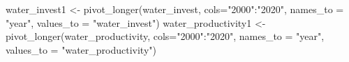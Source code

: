 \documentclass[
]{article}
\newenvironment{Shaded}{\begin{snugshade}}{\end{snugshade}}
\newcommand{\AttributeTok}[1]{\textcolor[rgb]{0.77,0.63,0.00}{#1}}
\newcommand{\FunctionTok}[1]{\textcolor[rgb]{0.00,0.00,0.00}{#1}}
\newcommand{\NormalTok}[1]{#1}
\newcommand{\OtherTok}[1]{\textcolor[rgb]{0.56,0.35,0.01}{#1}}
\newcommand{\SpecialCharTok}[1]{\textcolor[rgb]{0.00,0.00,0.00}{#1}}
\newcommand{\StringTok}[1]{\textcolor[rgb]{0.31,0.60,0.02}{#1}}
\begin{document}
\begin{Shaded}
\begin{Highlighting}[]
\NormalTok{water\_invest1 }\OtherTok{\textless{}{-}} \FunctionTok{pivot\_longer}\NormalTok{(water\_invest, }\AttributeTok{cols=}\StringTok{"2000"}\SpecialCharTok{:}\StringTok{"2020"}\NormalTok{,}
                                 \AttributeTok{names\_to =} \StringTok{"year"}\NormalTok{,}
                                 \AttributeTok{values\_to =} \StringTok{"water\_invest"}\NormalTok{)}
\NormalTok{water\_productivity1 }\OtherTok{\textless{}{-}} \FunctionTok{pivot\_longer}\NormalTok{(water\_productivity, }\AttributeTok{cols=}\StringTok{"2000"}\SpecialCharTok{:}\StringTok{"2020"}\NormalTok{,}
                                 \AttributeTok{names\_to =} \StringTok{"year"}\NormalTok{,}
                                 \AttributeTok{values\_to =} \StringTok{"water\_productivity"}\NormalTok{)}
\end{Highlighting}
\end{Shaded}
\end{document}
